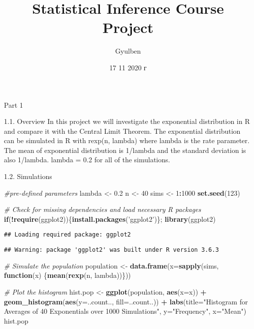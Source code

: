 \documentclass[
]{article}
\title{Statistical Inference Course Project}
\author{Gyulben}
\date{17 11 2020 г}
\newenvironment{Shaded}{\begin{snugshade}}{\end{snugshade}}
\newcommand{\CommentTok}[1]{\textcolor[rgb]{0.56,0.35,0.01}{\textit{#1}}}
\newcommand{\ControlFlowTok}[1]{\textcolor[rgb]{0.13,0.29,0.53}{\textbf{#1}}}
\newcommand{\DataTypeTok}[1]{\textcolor[rgb]{0.13,0.29,0.53}{#1}}
\newcommand{\DecValTok}[1]{\textcolor[rgb]{0.00,0.00,0.81}{#1}}
\newcommand{\FloatTok}[1]{\textcolor[rgb]{0.00,0.00,0.81}{#1}}
\newcommand{\KeywordTok}[1]{\textcolor[rgb]{0.13,0.29,0.53}{\textbf{#1}}}
\newcommand{\NormalTok}[1]{#1}
\newcommand{\OperatorTok}[1]{\textcolor[rgb]{0.81,0.36,0.00}{\textbf{#1}}}
\newcommand{\StringTok}[1]{\textcolor[rgb]{0.31,0.60,0.02}{#1}}
\begin{document}
\maketitle

Part 1

1.1. Overview In this project we will investigate the exponential
distribution in R and compare it with the Central Limit Theorem. The
exponential distribution can be simulated in R with rexp(n, lambda)
where lambda is the rate parameter. The mean of exponential distribution
is 1/lambda and the standard deviation is also 1/lambda. lambda = 0.2
for all of the simulations.

1.2. Simulations

\begin{Shaded}
\begin{Highlighting}[]
\CommentTok{#pre-defined parameters}
\NormalTok{lambda <-}\StringTok{ }\FloatTok{0.2}
\NormalTok{n <-}\StringTok{ }\DecValTok{40}
\NormalTok{sims <-}\StringTok{ }\DecValTok{1}\OperatorTok{:}\DecValTok{1000}
\KeywordTok{set.seed}\NormalTok{(}\DecValTok{123}\NormalTok{)}

\CommentTok{# Check for missing dependencies and load necessary R packages}
\ControlFlowTok{if}\NormalTok{(}\OperatorTok{!}\KeywordTok{require}\NormalTok{(ggplot2))\{}\KeywordTok{install.packages}\NormalTok{(}\StringTok{'ggplot2'}\NormalTok{)\}; }\KeywordTok{library}\NormalTok{(ggplot2)}
\end{Highlighting}
\end{Shaded}

\begin{verbatim}
## Loading required package: ggplot2
\end{verbatim}

\begin{verbatim}
## Warning: package 'ggplot2' was built under R version 3.6.3
\end{verbatim}

\begin{Shaded}
\begin{Highlighting}[]
\CommentTok{# Simulate the population}
\NormalTok{population <-}\StringTok{ }\KeywordTok{data.frame}\NormalTok{(}\DataTypeTok{x=}\KeywordTok{sapply}\NormalTok{(sims, }\ControlFlowTok{function}\NormalTok{(x) \{}\KeywordTok{mean}\NormalTok{(}\KeywordTok{rexp}\NormalTok{(n, lambda))\}))}

\CommentTok{# Plot the histogram}
\NormalTok{hist.pop <-}\StringTok{ }\KeywordTok{ggplot}\NormalTok{(population, }\KeywordTok{aes}\NormalTok{(}\DataTypeTok{x=}\NormalTok{x)) }\OperatorTok{+}\StringTok{ }
\StringTok{  }\KeywordTok{geom_histogram}\NormalTok{(}\KeywordTok{aes}\NormalTok{(}\DataTypeTok{y=}\NormalTok{..count.., }\DataTypeTok{fill=}\NormalTok{..count..)) }\OperatorTok{+}
\StringTok{  }\KeywordTok{labs}\NormalTok{(}\DataTypeTok{title=}\StringTok{"Histogram for Averages of 40 Exponentials over 1000 Simulations"}\NormalTok{, }\DataTypeTok{y=}\StringTok{"Frequency"}\NormalTok{, }\DataTypeTok{x=}\StringTok{"Mean"}\NormalTok{)}
\NormalTok{hist.pop}
\end{Highlighting}
\end{Shaded}
\end{document}
